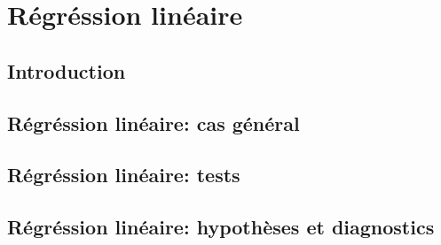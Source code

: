 \documentclass[letterpaper,10pt,english]{jupyterBook}
\begin{document}
\part{Régréssion linéaire}

\sphinxstepscope


\chapter{Introduction}
\label{\detokenize{R_xe9gr_xe9ssion_lin_xe9aire/introduction:introduction}}\label{\detokenize{R_xe9gr_xe9ssion_lin_xe9aire/introduction::doc}}
\sphinxstepscope


\chapter{Régréssion linéaire: cas général}
\label{\detokenize{R_xe9gr_xe9ssion_lin_xe9aire/cas_general:regression-lineaire-cas-general}}\label{\detokenize{R_xe9gr_xe9ssion_lin_xe9aire/cas_general::doc}}
\sphinxstepscope


\chapter{Régréssion linéaire: tests}
\label{\detokenize{R_xe9gr_xe9ssion_lin_xe9aire/tests:regression-lineaire-tests}}\label{\detokenize{R_xe9gr_xe9ssion_lin_xe9aire/tests::doc}}
\sphinxstepscope


\chapter{Régréssion linéaire: hypothèses et diagnostics}
\label{\detokenize{R_xe9gr_xe9ssion_lin_xe9aire/hypotheses_et_diagnostics:regression-lineaire-hypotheses-et-diagnostics}}\label{\detokenize{R_xe9gr_xe9ssion_lin_xe9aire/hypotheses_et_diagnostics::doc}}





\renewcommand{\indexname}{Proof Index}
\begin{sphinxtheindex}
\let\bigletter\sphinxstyleindexlettergroup
\bigletter{theorem\sphinxhyphen{}0}
\item\relax{}
\end{sphinxtheindex}

\renewcommand{\indexname}{Index}
\printindex
\end{document}
